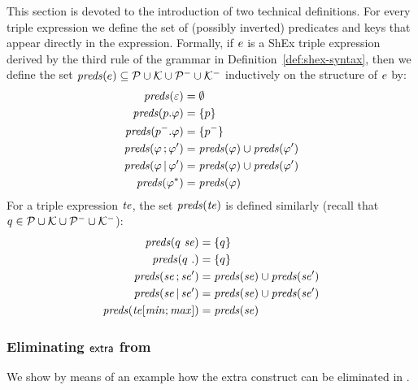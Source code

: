 This section is devoted to the introduction of two technical definitions.
For every triple expression we define the set of (possibly inverted) predicates
and keys that appear directly in the expression.
Formally, if $e$ is a ShEx triple expression derived by the  third rule of
the grammar in Definition~\ref{def:shex-syntax}, then we define the set
$\mathit{preds}(e) \subseteq \mathcal{P} \cup \mathcal{K} \cup \mathcal{P}^{-} \cup
\mathcal{K}^{-}$ inductively on the structure of $e$ by:
\begin{align*}
  \mathit{preds}(\varepsilon)
& =
  \emptyset
\\
  \mathit{preds}(p.\mathit{\varphi})
& =
  \{ p \}
\\
  \mathit{preds}(p^{-}.\mathit{\varphi})
& =
  \{ p^{-}\}
\\
  \mathit{preds}(\mathit{\varphi} \mathop{;} \mathit{\varphi}')
& =
  \mathit{preds}(\mathit{\varphi}) \cup \mathit{preds}(\mathit{\varphi}')
\\
  \mathit{preds}(\mathit{\varphi} \mathop{|} \mathit{\varphi}')
& =
  \mathit{preds}(\mathit{\varphi}) \cup \mathit{preds}(\mathit{\varphi}')
\\
  \mathit{preds}(\mathit{\varphi}^{*})
& =
  \mathit{preds}(\mathit{\varphi})
\end{align*}
For a \stshex triple expression $\mathit{te}$, the set $\mathit{preds}(\mathit{te})$ is defined
similarly (recall that $q \in \mathcal{P} \cup \mathcal{K} \cup \mathcal{P}^{-} \cup
\mathcal{K}^{-}$):
\begin{align*}
  \mathit{preds}(q\ \mathit{se})
& =
  \{ q \}
\\
  \mathit{preds}(q\ .)
& =
  \{ q \}
\\
  \mathit{preds}(\mathit{se} \mathop{;} \mathit{se}')
& =
  \mathit{preds}(\mathit{se}) \cup \mathit{preds}(\mathit{se}')
\\
  \mathit{preds}(\mathit{se} \mathop{|} \mathit{se}')
& =
  \mathit{preds}(\mathit{se}) \cup \mathit{preds}(\mathit{se}')
\\
  \mathit{preds}(\mathit{te}[\mathit{min}; \mathit{max}])
& =
  \mathit{preds}(\mathit{se})
\end{align*}

\subsubsection{Eliminating $\mathsf{extra}$ from \stshex}
\label{app:sec-shex-eliminate-extra}

We show by means of an example how the extra construct can be eliminated in
\stshex.

